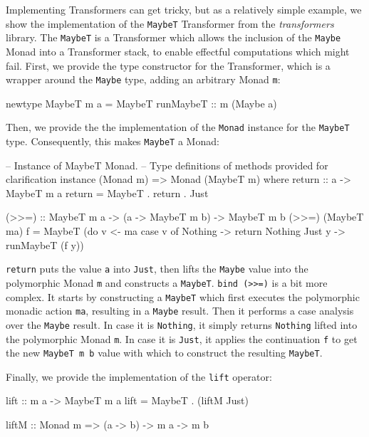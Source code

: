 Implementing Transformers can get tricky, but as a relatively simple example, we show the implementation of the \texttt{MaybeT} Transformer from the \textit{transformers} library. The \texttt{MaybeT} is a Transformer which allows the inclusion of the \texttt{Maybe} Monad into a Transformer stack, to enable effectful computations which might fail. First, we provide the type constructor for the Transformer, which is a wrapper around the \texttt{Maybe} type, adding an arbitrary Monad \texttt{m}:

\begin{HaskellCode}
newtype MaybeT m a = MaybeT { runMaybeT :: m (Maybe a) }
\end{HaskellCode}

Then, we provide the the implementation \cite{allen_haskell_2016} of the \texttt{Monad} instance for the \texttt{MaybeT} type. Consequently, this makes \texttt{MaybeT} a Monad:

\begin{HaskellCode}
-- Instance of MaybeT Monad.
-- Type definitions of methods provided for clarification
instance (Monad m) => Monad (MaybeT m) where
  return :: a -> MaybeT m a
  return = MaybeT . return . Just

  (>>=) :: MaybeT m a -> (a -> MaybeT m b) -> MaybeT m b
  (>>=) (MaybeT ma) f = MaybeT (do 
      v <- ma
      case v of
          Nothing -> return Nothing
          Just y  -> runMaybeT (f y))
\end{HaskellCode}

\texttt{return} puts the value \texttt{a} into \texttt{Just}, then lifts the \texttt{Maybe} value into the polymorphic Monad \texttt{m} and constructs a \texttt{MaybeT}. \texttt{bind (>>=)} is a bit more complex. It starts by constructing a \texttt{MaybeT} which first executes the polymorphic monadic action \texttt{ma}, resulting in a \texttt{Maybe} result. Then it performs a case analysis over the \texttt{Maybe} result. In case it is \texttt{Nothing}, it simply returns \texttt{Nothing} lifted into the polymorphic Monad \texttt{m}. In case it is \texttt{Just}, it applies the continuation \texttt{f} to get the new \texttt{MaybeT m b} value with which to construct the resulting \texttt{MaybeT}.

Finally, we provide the implementation of the \texttt{lift} operator:
 
\begin{HaskellCode}
lift :: m a -> MaybeT m a
lift = MaybeT . (liftM Just)

liftM :: Monad m => (a -> b) -> m a -> m b
\end{HaskellCode}

